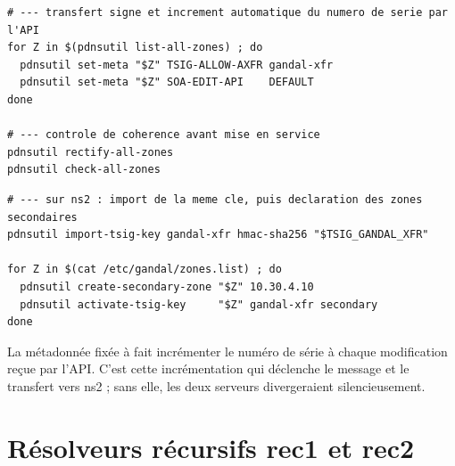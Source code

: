 \begin{lstlisting}[caption={Création de l'espace de nommage sur ns1},
  label=lst:zones]
# --- transfert signe et increment automatique du numero de serie par l'API
for Z in $(pdnsutil list-all-zones) ; do
  pdnsutil set-meta "$Z" TSIG-ALLOW-AXFR gandal-xfr
  pdnsutil set-meta "$Z" SOA-EDIT-API    DEFAULT
done

# --- controle de coherence avant mise en service
pdnsutil rectify-all-zones
pdnsutil check-all-zones
\end{lstlisting}

\begin{lstlisting}[caption={Déclaration des zones secondaires sur ns2},
  label=lst:ns2zones]
# --- sur ns2 : import de la meme cle, puis declaration des zones secondaires
pdnsutil import-tsig-key gandal-xfr hmac-sha256 "$TSIG_GANDAL_XFR"

for Z in $(cat /etc/gandal/zones.list) ; do
  pdnsutil create-secondary-zone "$Z" 10.30.4.10
  pdnsutil activate-tsig-key     "$Z" gandal-xfr secondary
done
\end{lstlisting}

La métadonnée  fixée à  fait incrémenter le
numéro de série à chaque modification reçue par l'API. C'est cette
incrémentation qui déclenche le message  et le transfert vers ns2 ;
sans elle, les deux serveurs divergeraient silencieusement.

\section{Résolveurs récursifs rec1 et rec2}
\label{sec:recursif}

